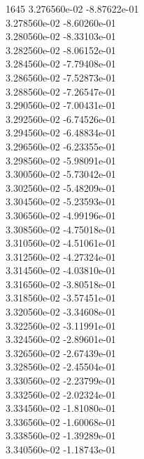 1645	3.276560e-02	-8.87622e-01	\\ 	3.278560e-02	-8.60260e-01	\\ 	3.280560e-02	-8.33103e-01	\\ 	3.282560e-02	-8.06152e-01	\\ 	3.284560e-02	-7.79408e-01	\\ 	3.286560e-02	-7.52873e-01	\\ 	3.288560e-02	-7.26547e-01	\\ 	3.290560e-02	-7.00431e-01	\\ 	3.292560e-02	-6.74526e-01	\\ 	3.294560e-02	-6.48834e-01	\\ 	3.296560e-02	-6.23355e-01	\\ 	3.298560e-02	-5.98091e-01	\\ 	3.300560e-02	-5.73042e-01	\\ 	3.302560e-02	-5.48209e-01	\\ 	3.304560e-02	-5.23593e-01	\\ 	3.306560e-02	-4.99196e-01	\\ 	3.308560e-02	-4.75018e-01	\\ 	3.310560e-02	-4.51061e-01	\\ 	3.312560e-02	-4.27324e-01	\\ 	3.314560e-02	-4.03810e-01	\\ 	3.316560e-02	-3.80518e-01	\\ 	3.318560e-02	-3.57451e-01	\\ 	3.320560e-02	-3.34608e-01	\\ 	3.322560e-02	-3.11991e-01	\\ 	3.324560e-02	-2.89601e-01	\\ 	3.326560e-02	-2.67439e-01	\\ 	3.328560e-02	-2.45504e-01	\\ 	3.330560e-02	-2.23799e-01	\\ 	3.332560e-02	-2.02324e-01	\\ 	3.334560e-02	-1.81080e-01	\\ 	3.336560e-02	-1.60068e-01	\\ 	3.338560e-02	-1.39289e-01	\\ 	3.340560e-02	-1.18743e-01	\\ \hline
